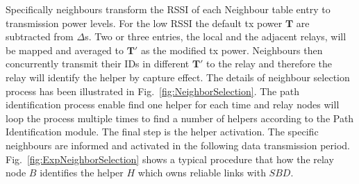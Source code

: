 \documentclass[conference]{IEEEtran}
\begin{document}
Specifically neighbours transform the RSSI of each Neighbour table entry to transmission power levels. For the low RSSI the default tx power $\mathbf{T}$ are subtracted from $\Delta$s. Two or three entries, the local and the adjacent relays, will be mapped and averaged to $\mathbf{T'}$ as the modified tx power. Neighbours then concurrently transmit their IDs in different $\mathbf{T'}$ to the relay and therefore the relay will identify the helper by capture effect. The details of neighbour selection process has been illustrated in Fig.~\ref{fig:NeighborSelection}. The path identification process enable find one helper for each time and relay nodes will loop the process multiple times to find a number of helpers according to the Path Identification module. The final step is the helper activation. The specific neighbours are informed and activated in the following data transmission period. Fig.~\ref{fig:ExpNeighborSelection} shows a typical procedure that how the relay node $B$ identifies the helper $H$ which owns reliable links with $S B D$.




\end{document}
